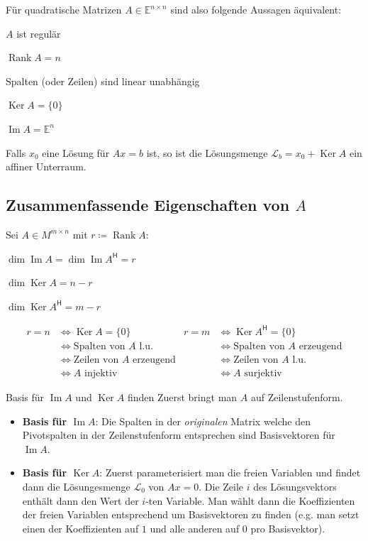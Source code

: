 \documentclass[a4paper,10pt]{article}
\DeclareMathOperator{\Rank}{Rank}
\DeclareMathOperator{\Image}{Im}
\DeclareMathOperator{\Kernel}{Ker}
\newcommand*{\hermconj}{\mathsf{H}}
\def\E{\mathbb{E}}
\begin{document}
Für quadratische Matrizen $A \in \E^{n \times n}$ sind also folgende Aussagen äquivalent:

\begin{rowlist}
  \item $A$ ist regulär
  \item $\Rank A = n$
  \item Spalten (oder Zeilen) sind linear unabhängig
  \item $\Kernel A = \{0\}$
  \item $\Image A = \E^n$
\end{rowlist}

Falls $x_0$ eine Lösung für $Ax = b$ ist, so ist die Lösungsmenge $\mathcal{L}_b = x_0 + \Kernel A$ ein affiner Unterraum.

\subsection{Zusammenfassende Eigenschaften von $A$}

Sei $A \in M^{m \times n}$ mit $r \coloneqq \Rank A$:

\begin{rowlist}
  \item $\dim \Image A = \dim \Image A^\hermconj = r$
  \item $\dim \Kernel A = n - r$
  \item $\dim \Kernel A^\hermconj = m - r$
\end{rowlist}

\begin{align*}
  r = n & \Leftrightarrow \Kernel A = \{ 0 \} & r = m & \Leftrightarrow \Kernel A^\hermconj = \{ 0 \} \\
  & \Leftrightarrow \text{Spalten von $A$ l.u.} & & \Leftrightarrow \text{Spalten von $A$ erzeugend}\\
  & \Leftrightarrow \text{Zeilen von $A$ erzeugend} & & \Leftrightarrow \text{Zeilen von $A$ l.u.}\\
  & \Leftrightarrow A \text{ injektiv} & & \Leftrightarrow A \text{ surjektiv}
\end{align*}

\begin{subbox}{Basis für $\Image A$ und $\Kernel A$ finden}
  Zuerst bringt man $A$ auf Zeilenstufenform.
  \begin{itemize}
    \item \textbf{Basis für $\Image A$}: Die Spalten in der \textit{originalen} Matrix welche den Pivotspalten in der Zeilenstufenform entsprechen sind Basisvektoren für $\Image A$.
    \item \textbf{Basis für $\Kernel A$}: Zuerst parameterisiert man die freien Variablen und findet dann die Lösungesmenge $\mathcal{L}_0$ von $Ax = 0$. Die Zeile $i$ des Lösungsvektors enthält dann den Wert der $i$-ten Variable. Man wählt dann die Koeffizienten der freien Variablen entsprechend um Basisvektoren zu finden (e.g. man setzt einen der Koeffizienten auf $1$ und alle anderen auf $0$ pro Basisvektor). 
  \end{itemize}
\end{subbox}
\end{document}

